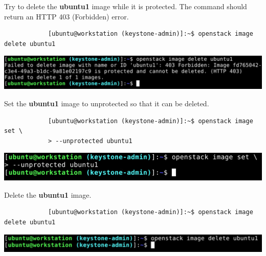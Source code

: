 \documentclass[letterpaper, 12pt]{article}
\begin{document}
\begin{enumerate}
    \begin{labstep}
        Try to delete the \textbf{ubuntu1} image while it is protected.
        The command should return an HTTP 403 (Forbidden) error.
        \begin{lstlisting}
            [ubuntu@workstation (keystone-admin)]:~$ openstack image delete ubuntu1
        \end{lstlisting}

        \begin{center}
            \includegraphics[width=\linewidth]{images/part1/step15.png}
        \end{center}
    \end{labstep}

    \begin{labstep}
        Set the \textbf{ubuntu1} image to unprotected so that it can be deleted.
        \begin{lstlisting}
            [ubuntu@workstation (keystone-admin)]:~$ openstack image set \
            > --unprotected ubuntu1
        \end{lstlisting}

        \begin{center}
            \includegraphics[width=\linewidth]{images/part1/step16.png}
        \end{center}
    \end{labstep}

    \begin{labstep}
        Delete the \textbf{ubuntu1} image.
        \begin{lstlisting}
            [ubuntu@workstation (keystone-admin)]:~$ openstack image delete ubuntu1
        \end{lstlisting}

        \begin{center}
            \includegraphics[width=\linewidth]{images/part1/step17.png}
        \end{center}
    \end{labstep}


\end{enumerate}
\end{document}
